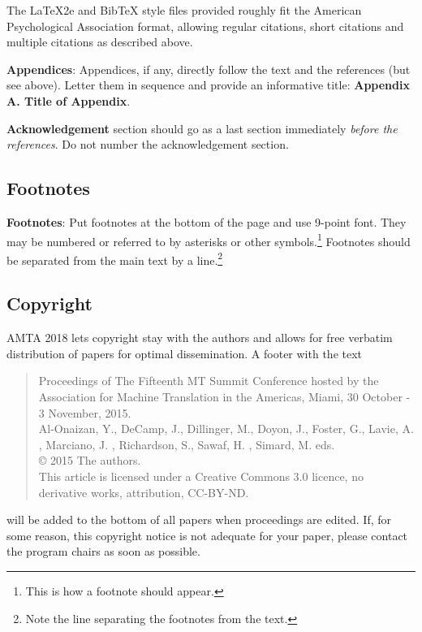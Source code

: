\documentclass[]{article}
\newcommand{\confname}{AMTA 2018}
\begin{document}
The \LaTeX2e{} and Bib\TeX{} style files provided roughly fit the
American Psychological Association format, allowing regular citations,
short citations and multiple citations as described above.

{\bf Appendices}: Appendices, if any, directly follow the text and the
references (but see above).  Letter them in sequence and provide an
informative title: {\bf Appendix A. Title of Appendix}.

\textbf{Acknowledgement} section should go as a last section immediately
\textit{before the references}.  Do not number the acknowledgement section.

\subsection{Footnotes}

{\bf Footnotes}: Put footnotes at the bottom of the page and use
9-point font. They may be numbered or referred to by asterisks or
other symbols.\footnote{This is how a footnote should appear.}
Footnotes should be separated from the main text by a
line.\footnote{Note the line separating the footnotes from the text.}

\subsection{Copyright}


\confname{} lets copyright stay with the authors and allows for free verbatim distribution of papers for optimal dissemination. A footer with the text
\begin{quote}
\begin{small}
\begin{it}
  Proceedings of The Fifteenth MT Summit Conference hosted by the Association for Machine Translation in the Americas, Miami, 30 October - 3 November, 2015.\\
  Al-Onaizan, Y., DeCamp, J., Dillinger, M., Doyon, J., Foster, G., Lavie, A. , Marciano, J. , Richardson, S., Sawaf, H. , Simard,
  M. eds.\\
  \copyright{} 2015 The authors.\\
  This article is licensed under a Creative Commons 3.0 licence, no
  derivative works, attribution, CC-BY-ND.
\end{it}
\end{small}
\end{quote}
will be added to the bottom of all papers when proceedings are
edited. If, for some reason, this copyright notice is not adequate for
your paper, please contact the program chairs as soon as possible.
\end{document}
